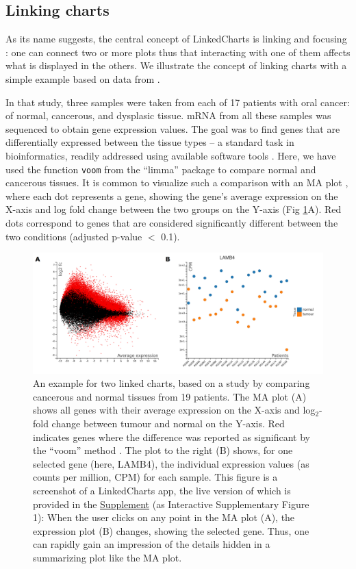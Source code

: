 \documentclass[twocolumn,10pt]{article}
\newcommand{\Supplement}{\href{https://anders-biostat.github.io/lc-paper/}{Supplement}}
\begin{document}
\subsection{Linking charts}

As its name suggests, the central concept of LinkedCharts is linking and focusing \citep{buja_1991}: one can connect two or more plots thus that interacting with one of them affects what is displayed in the others. We illustrate the concept of linking charts with a simple example based on data from \citet{conway_2015}.

In that study, three samples were taken from each of 17 patients with oral cancer: of normal, cancerous, and dysplasic tissue. mRNA from all these samples was sequenced to obtain gene expression values. The goal was to find genes that are differentially expressed between the tissue types -- a standard task in bioinformatics, readily addressed using available software tools \citep{ritchie_2015, love_2014}. Here, we have used the function \texttt{voom} from the ``limma'' package \citep{law_2014} to compare normal and cancerous tissues. It is common to visualize such a comparison with an MA plot \citep{dudoit_2002}, where each dot represents a gene, showing the gene's average expression on the X-axis and log fold change between the two groups on the Y-axis (Fig \ref{FigD}A). Red dots correspond to genes that are considered significantly different between the two conditions (adjusted p-value $<$ 0.1). 

\begin{figure}
   \centering\includegraphics[width=.9\textwidth]{FigD/figD.png}
   \caption{An example for two linked charts, based on a study by \citet{conway_2015} comparing cancerous and normal tissues from 19 patients. The MA plot (A) shows all genes with their average expression on the X-axis and log$_2$-fold change between tumour and normal on the Y-axis. Red indicates genes where the difference was reported as significant by the ``voom'' method \citep{law_2014}. The plot to the right (B) shows, for one selected gene (here, LAMB4), the individual expression values (as counts per million, CPM) for each sample. This figure is a screenshot of a LinkedCharts app, the live version of which is provided in the \Supplement{} (as Interactive Supplementary Figure 1): When the user clicks on any point in the MA plot (A), the expression plot (B) changes, showing the selected gene. Thus, one can rapidly gain an impression of the details hidden in a summarizing plot like the MA plot.}  
   \label{FigD}
\end{figure}
\end{document}

